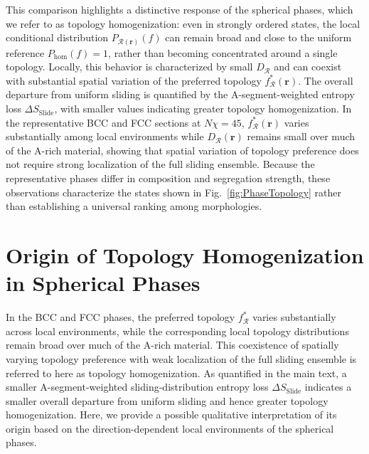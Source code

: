 \documentclass[journal=mamobx,manuscript=article]{achemso}
\begin{document}
	This comparison highlights a distinctive response of the spherical phases, which we refer to as topology homogenization: even in strongly ordered states, the local conditional distribution $P_{\mathcal R(\bm r)}(f)$ can remain broad and close to the uniform reference $P_{\mathrm{hom}}(f)=1$, rather than becoming concentrated around a single topology.
	Locally, this behavior is characterized by small $D_{\mathcal R}$ and can coexist with substantial spatial variation of the preferred topology $f_{\mathcal R}^\ast(\bm r)$.
	The overall departure from uniform sliding is quantified by the A-segment-weighted entropy loss $\Delta S_{\mathrm{Slide}}$, with smaller values indicating greater topology homogenization.
	In the representative BCC and FCC sections at $N\chi=45$, $f_{\mathcal R}^\ast(\bm r)$ varies substantially among local environments while $D_{\mathcal R}(\bm r)$ remains small over much of the A-rich material, showing that spatial variation of topology preference does not require strong localization of the full sliding ensemble.
	Because the representative phases differ in composition and segregation strength, these observations characterize the states shown in Fig.~\ref{fig:PhaseTopology} rather than establishing a universal ranking among morphologies.


\section{Origin of Topology Homogenization in Spherical Phases}\label{sec:TopologyHomogenization}

	In the BCC and FCC phases, the preferred topology $f_{\mathcal R}^\ast$ varies substantially across local environments, while the corresponding local topology distributions remain broad over much of the A-rich material.
	This coexistence of spatially varying topology preference with weak localization of the full sliding ensemble is referred to here as topology homogenization.
	As quantified in the main text, a smaller A-segment-weighted sliding-distribution entropy loss $\Delta S_{\mathrm{Slide}}$ indicates a smaller overall departure from uniform sliding and hence greater topology homogenization.
	Here, we provide a possible qualitative interpretation of its origin based on the direction-dependent local environments of the spherical phases.
\end{document}
